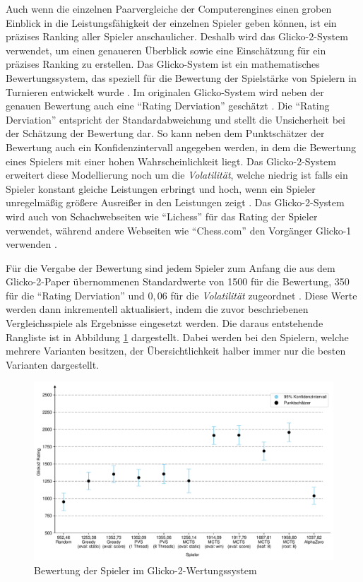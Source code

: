 Auch wenn die einzelnen Paarvergleiche der Computerengines einen groben Einblick in die Leistungsfähigkeit der einzelnen Spieler geben können, ist ein präzises Ranking aller Spieler anschaulicher. Deshalb wird das Glicko-2-System verwendet, um einen genaueren Überblick sowie eine Einschätzung für ein präzises Ranking zu erstellen. Das Glicko-System ist ein mathematisches Bewertungssystem, das speziell für die Bewertung der Spielstärke von Spielern in Turnieren entwickelt wurde \cite[S. 377]{1999.GlickoMath}. Im originalen Glicko-System wird neben der genauen Bewertung auch eine \enquote{Rating Derviation} geschätzt \cite[S. 1f.]{2016.Glicko}. Die \enquote{Rating Derviation} entspricht der Standardabweichung und stellt die Unsicherheit bei der Schätzung der Bewertung dar. So kann neben dem Punktschätzer der Bewertung auch ein Konfidenzintervall angegeben werden, in dem die Bewertung eines Spielers mit einer hohen Wahrscheinlichkeit liegt. Das Glicko-2-System erweitert diese Modellierung noch um die \emph{Volatilität}, welche niedrig ist falls ein Spieler konstant gleiche Leistungen erbringt und hoch, wenn ein Spieler unregelmäßig größere Ausreißer in den Leistungen zeigt \cite[S. 1]{2022.Glicko2}. Das Glicko-2-System wird auch von Schachwebseiten wie \enquote{Lichess} für das Rating der Spieler verwendet, während andere Webseiten wie \enquote{Chess.com} den Vorgänger Glicko-1 verwenden \cite{2024.ChessRatingSystems}.

Für die Vergabe der Bewertung sind jedem Spieler zum Anfang die aus dem Glicko-2-Paper übernommenen Standardwerte von 1500 für die Bewertung, 350 für die \enquote{Rating Derviation} und $0{,}06$ für die \emph{Volatilität} zugeordnet \cite[S. 2]{2022.Glicko2}. Diese Werte werden dann inkrementell aktualisiert, indem die zuvor beschriebenen Vergleichsspiele als Ergebnisse eingesetzt werden. Die daraus entstehende Rangliste ist in Abbildung \ref{fig:player-ratings} dargestellt. Dabei werden bei den Spielern, welche mehrere Varianten besitzen, der Übersichtlichkeit halber immer nur die besten Varianten dargestellt.

\pagebreak

\begin{figure}[!ht]
    \centering
    \includegraphics[width=\textwidth]{res/pictures/plots/player-ratings.pdf}
    \caption{Bewertung der Spieler im Glicko-2-Wertungssystem}
    \label{fig:player-ratings}
\end{figure}

